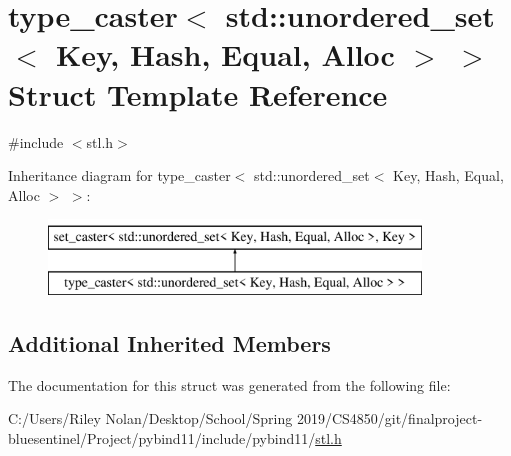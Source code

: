 \hypertarget{structtype__caster_3_01std_1_1unordered__set_3_01_key_00_01_hash_00_01_equal_00_01_alloc_01_4_01_4}{}\section{type\+\_\+caster$<$ std\+::unordered\+\_\+set$<$ Key, Hash, Equal, Alloc $>$ $>$ Struct Template Reference}
\label{structtype__caster_3_01std_1_1unordered__set_3_01_key_00_01_hash_00_01_equal_00_01_alloc_01_4_01_4}


{\ttfamily \#include $<$stl.\+h$>$}

Inheritance diagram for type\+\_\+caster$<$ std\+::unordered\+\_\+set$<$ Key, Hash, Equal, Alloc $>$ $>$\+:\begin{figure}[H]
\begin{center}
\leavevmode
\includegraphics[height=2.000000cm]{structtype__caster_3_01std_1_1unordered__set_3_01_key_00_01_hash_00_01_equal_00_01_alloc_01_4_01_4}
\end{center}
\end{figure}
\subsection*{Additional Inherited Members}


The documentation for this struct was generated from the following file\+:\begin{DoxyCompactItemize}
\item 
C\+:/\+Users/\+Riley Nolan/\+Desktop/\+School/\+Spring 2019/\+C\+S4850/git/finalproject-\/bluesentinel/\+Project/pybind11/include/pybind11/\mbox{\hyperlink{stl_8h}{stl.\+h}}\end{DoxyCompactItemize}
